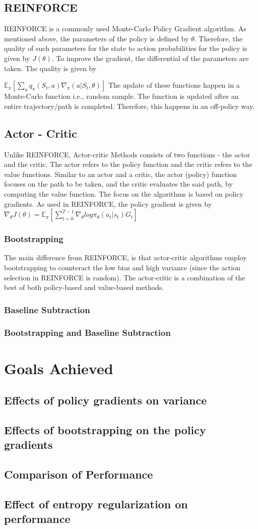 \documentclass{article}
\begin{document}
\subsection{REINFORCE}
REINFORCE is a commonly used Monte-Carlo Policy Gradient algorithm. As mentioned above, the parameters of the policy is defined by $\theta$. Therefore, the quality of such parameters for the state to action probabilities for the policy is given by $J(\theta)$. To improve the gradient, the differential of the parameters are taken. 
The quality is given by 

$\mathbb{E}_\pi [ \sum _a q_\pi(S_t, a)\nabla_\pi(a|S_t, \theta)]$
The update of these functions happen in a Monte-Carlo function i.e., random sample. The function is updated after an entire trajectory/path is completed. Therefore, this happens in an off-policy way.  
\subsection{Actor - Critic}
Unlike REINFORCE, Actor-critic Methods consists of two functions - the actor and the critic. The actor refers to the policy function and the critic refers to the value functions. Similar to an actor and a critic, the actor (policy) function focuses on the path to be taken, and the critic evaluates the said path, by computing the value function. 
The focus on the algorithms is based on policy gradients. \cite{actor-critic}
As used in REINFORCE, the policy gradient is given by 
$\nabla_\theta J(\theta) = \mathbb{E}_\pi[\sum _{t=0}^{T-1} \nabla_\theta log\pi_\theta (a_t|s_t)G_t]$
\subsubsection{Bootstrapping}
The main difference from REINFORCE, is that actor-critic algorithms employ bootstrapping to counteract the low bias and high variance (since the action selection in REINFORCE is random). The actor-critic is a combination of the best of both policy-based and value-based methods. 
\subsubsection{Baseline Subtraction}
\subsubsection{Bootstrapping and Baseline Subtraction}

\section{Goals Achieved}
\subsection{Effects of policy gradients on variance}
\subsection{Effects of bootstrapping on the policy gradients}
\subsection{Comparison of Performance}
\subsection{Effect of entropy regularization on performance}
\end{document}
